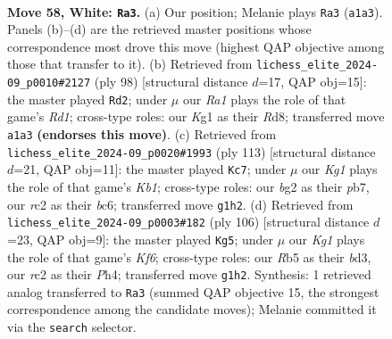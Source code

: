 \documentclass[11pt]{article}
\begin{document}
\clearpage

\begin{figure}[p]\centering
\begin{subfigure}{0.46\textwidth}\centering
\resizebox{\linewidth}{!}{%
\newchessgame
\chessboard[
  setfen={8/4kp2/6p1/1R6/1P5P/8/2r3b1/R5K1 w - - 1 58},
  showmover=false,
  pgfstyle=straightmove, color=movearrow, markmove={a1-a3}
]}
\caption{}
\end{subfigure}\hfill
\begin{subfigure}{0.46\textwidth}\centering
\resizebox{\linewidth}{!}{%
\newchessgame
\chessboard[
  setfen={3R4/r2b1p2/3P1kp1/8/7P/8/8/3R1K2 w - - 1 50},
  showmover=false,
  pgfstyle=straightmove, color=movearrow, markmove={d1-d2}
]}
\caption{}
\end{subfigure}
\\[4pt]
\begin{subfigure}{0.46\textwidth}\centering
\resizebox{\linewidth}{!}{%
\newchessgame
\chessboard[
  setfen={1k4r1/1P6/2B2pb1/2K5/5P1R/8/8/8 b - - 0 57},
  showmover=false,
  pgfstyle=straightmove, color=movearrow, markmove={b8-c7}
]}
\caption{}
\end{subfigure}\hfill
\begin{subfigure}{0.46\textwidth}\centering
\resizebox{\linewidth}{!}{%
\newchessgame
\chessboard[
  setfen={5R2/7k/5Kp1/8/4p2P/3bP2P/8/8 w - - 4 54},
  showmover=false,
  pgfstyle=straightmove, color=movearrow, markmove={f6-g5}
]}
\caption{}
\end{subfigure}
\caption{\textbf{Move 58, White: \texttt{Ra3}.} (a) Our position; Melanie plays \texttt{Ra3} (\texttt{a1a3}). Panels (b)--(d) are the retrieved master positions whose correspondence most drove this move (highest QAP objective among those that transfer to it). (b) Retrieved from \texttt{lichess\_elite\_2024-09\_p0010\#2127} (ply 98) [structural distance $d$=17, QAP obj=15]: the master played \texttt{Rd2}; under $\mu$ our \emph{Ra1} plays the role of that game's \emph{Rd1}; cross-type roles: our \emph{K}g1 as their \emph{R}d8; transferred move \texttt{a1a3} \textbf{(endorses this move)}. (c) Retrieved from \texttt{lichess\_elite\_2024-09\_p0020\#1993} (ply 113) [structural distance $d$=21, QAP obj=11]: the master played \texttt{Kc7}; under $\mu$ our \emph{Kg1} plays the role of that game's \emph{Kb1}; cross-type roles: our \emph{b}g2 as their \emph{p}b7, our \emph{r}c2 as their \emph{b}c6; transferred move \texttt{g1h2}. (d) Retrieved from \texttt{lichess\_elite\_2024-09\_p0003\#182} (ply 106) [structural distance $d$=23, QAP obj=9]: the master played \texttt{Kg5}; under $\mu$ our \emph{Kg1} plays the role of that game's \emph{Kf6}; cross-type roles: our \emph{R}b5 as their \emph{b}d3, our \emph{r}c2 as their \emph{P}h4; transferred move \texttt{g1h2}. Synthesis: 1 retrieved analog transferred to \texttt{Ra3} (summed QAP objective 15, the strongest correspondence among the candidate moves); Melanie committed it via the \texttt{search} selector.}
\label{fig:thought-m114}
\end{figure}
\end{document}
